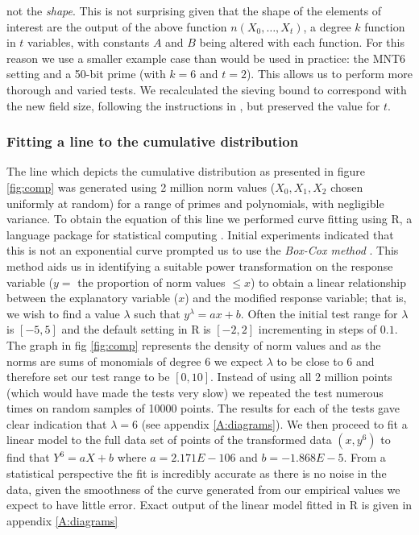 \documentclass[a4paper, 10pt, envcountsect, runningheads]{article}
\numberwithin{figure}{section}
\numberwithin{equation}{section}
\begin{document}
not the \textit{shape}. This is not surprising given that the shape of the elements of interest are the output of the above function $n(X_0,\ldots,X_t)$, a degree $k$ function in $t$ variables, with constants $A$ and $B$ being altered with each function. For this reason we use a smaller example case than would be used in practice: the MNT6 setting and a 50-bit prime (with $k=6$ and $t=2$). This allows us to perform more thorough and varied tests. We recalculated the sieving bound to correspond with the new field size, following the instructions in \cite{joux-lercier-smart-vercauteren06}, but preserved the value for $t$.


\subsubsection*{Fitting a line to the cumulative distribution}
The line which depicts the cumulative distribution as presented in figure \ref{fig:comp} was generated using 2 million norm values ($X_0,X_1,X_2$ chosen uniformly at random) for a range of primes and polynomials, with negligible variance. To obtain the equation of this line we performed curve fitting using R, a language package for statistical computing \cite{R}. Initial experiments indicated that this is not an exponential curve prompted us to use the {\em Box-Cox method} \cite{box-cox}. This method aids us in identifying a suitable power transformation on the response variable ($y=$ the proportion of norm values $\leq x$) to obtain a linear relationship between the explanatory variable ($x$) and the modified response variable; that is, we wish to find a value $\lambda$ such that $y^\lambda=ax+b$. Often the initial test range for $\lambda$ is $[-5,5]$ and the default setting in R is $[-2,2]$ incrementing in steps of $0.1$. The graph in fig \ref{fig:comp} represents the density of norm values and as the norms are sums of monomials of degree 6 we expect $\lambda$ to be close to 6 and therefore set our test range to be $[0,10]$. Instead of using all 2 million points (which would have made the tests very slow) we repeated the test numerous times on random samples of 10000 points. The results for each of the tests gave clear indication that $\lambda=6$ (see appendix \ref{A:diagrams}). 
We then proceed to fit a linear model to the full data set of points of the transformed data $(x,y^6)$ to find that $Y^6=aX+b$ where $a=2.171E-106$ and $b=-1.868E-5$. From a statistical perspective the fit is incredibly accurate as there is no noise in the data, given the smoothness of the curve generated from our empirical values we expect to have little error. Exact output of the linear model fitted in R is given in appendix \ref{A:diagrams}
\end{document}

